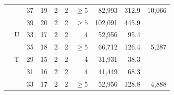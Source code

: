 \begin{tabular}{@{}clrrrrrrrr@{}}
 &  & 37 & 19 & 2 & 2 & $\ge5$ & 82{,}993 & 312.9 & 10{,}066 \\
 &  & 39 & 20 & 2 & 2 & $\ge5$ & 102{,}091 & 445.9 &  \\
\addlinespace
 & U & 33 & 17 & 2 & 2 & 4 & 52{,}956 & 95.4 &  \\
 &  & 35 & 18 & 2 & 2 & $\ge5$ & 66{,}712 & 126.4 & 5{,}287 \\
\addlinespace
 & T & 29 & 15 & 2 & 2 & 4 & 31{,}931 & 38.3 &  \\
 &  & 31 & 16 & 2 & 2 & 4 & 41{,}449 & 68.3 &  \\
 &  & 33 & 17 & 2 & 2 & $\ge5$ & 52{,}956 & 128.8 & 4{,}888 \\
\bottomrule
\end{tabular}
